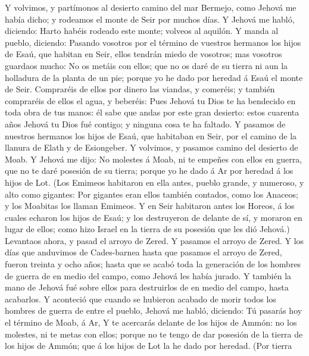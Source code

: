  Y volvimos, y partímonos al desierto camino del mar
Bermejo, como Jehová me había dicho; y rodeamos el monte de Seir por
muchos días.  Y Jehová me habló, diciendo: 
Harto habéis rodeado este monte; volveos al aquilón.  Y
manda al pueblo, diciendo: Pasando vosotros por el término de vuestros
hermanos los hijos de Esaú, que habitan en Seir, ellos tendrán miedo de
vosotros; mas vosotros guardaos mucho:  No os metáis con
ellos; que no os daré de su tierra ni aun la holladura de la planta de
un pie; porque yo he dado por heredad á Esaú el monte de Seir.
 Compraréis de ellos por dinero las viandas, y comeréis; y
también compraréis de ellos el agua, y beberéis:  Pues
Jehová tu Dios te ha bendecido en toda obra de tus manos: él sabe que
andas por este gran desierto: estos cuarenta años Jehová tu Dios fué
contigo; y ninguna cosa te ha faltado.  Y pasamos de
nuestros hermanos los hijos de Esaú, que habitaban en Seir, por el
camino de la llanura de Elath y de Esiongeber. Y volvimos, y pasamos
camino del desierto de Moab.  Y Jehová me dijo: No molestes
á Moab, ni te empeñes con ellos en guerra, que no te daré posesión de su
tierra; porque yo he dado á Ar por heredad á los hijos de Lot.
 (Los Emimeos habitaron en ella antes, pueblo grande, y
numeroso, y alto como gigantes:  Por gigantes eran ellos
también contados, como los Anaceos; y los Moabitas los llaman Emimeos.
 Y en Seir habitaron antes los Horeos, á los cuales echaron
los hijos de Esaú; y los destruyeron de delante de sí, y moraron en
lugar de ellos; como hizo Israel en la tierra de su posesión que les dió
Jehová.)  Levantaos ahora, y pasad el arroyo de Zered. Y
pasamos el arroyo de Zered.  Y los días que anduvimos de
Cades-barnea hasta que pasamos el arroyo de Zered, fueron treinta y ocho
años; hasta que se acabó toda la generación de los hombres de guerra de
en medio del campo, como Jehová les había jurado.  Y
también la mano de Jehová fué sobre ellos para destruirlos de en medio
del campo, hasta acabarlos.  Y aconteció que cuando se
hubieron acabado de morir todos los hombres de guerra de entre el
pueblo,  Jehová me habló, diciendo:  Tú
pasarás hoy el término de Moab, á Ar,  Y te acercarás
delante de los hijos de Ammón: no los molestes, ni te metas con ellos;
porque no te tengo de dar posesión de la tierra de los hijos de Ammón;
que á los hijos de Lot la he dado por heredad.  (Por tierra
